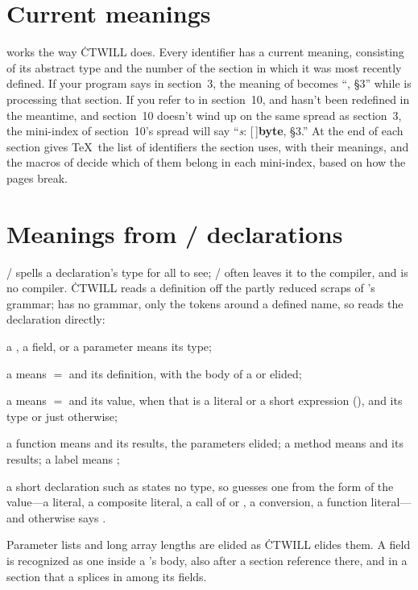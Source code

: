 \section{Current meanings}
 works the way \.{CTWILL} does. Every identifier has a current
meaning, consisting of its abstract type and the number of the section in which
it was most recently defined. If your program says  in
section~3, the meaning of  becomes ``, \S3'' while 
is processing that section. If you refer to  in section~10, and 
hasn't been redefined in the meantime, and section~10 doesn't wind up on the
same spread as section~3, the mini-index of section~10's spread will say
``{\it s\/}: [\,]{\bf byte}, \S3.'' At the end of each section  gives
\TeX\ the list of identifiers the section uses, with their meanings, and the
macros of  decide which of them belong in each mini-index, based
on how the pages break.

\section{Meanings from \GO/ declarations}
\CEE/ spells a declaration's type for all to see; \GO/ often leaves it to the
compiler, and  is no compiler. \.{CTWILL} reads a definition off the
partly reduced scraps of 's grammar;  has no grammar, only
the tokens around a defined name, so  reads the declaration directly:

\bull a , a field, or a parameter means its type;

\bull a  means $=$ and its definition, with the body of a 
or  elided;

\bull a  means $=$ and its value, when that is a literal or a short
expression (), and its type or just  otherwise;

\bull a function means  and its results, the parameters elided; a
method means  and its results; a label means ;

\bull a short declaration such as  states no type, so 
guesses one from the form of the value---a literal, a composite literal, a call
of  or , a conversion, a function literal---and otherwise
says .

\noindent Parameter lists and long array lengths are elided as \.{CTWILL}
elides them. A field is recognized as one inside a 's body, also
after a section reference there, and in a section that a  splices in
among its fields.

